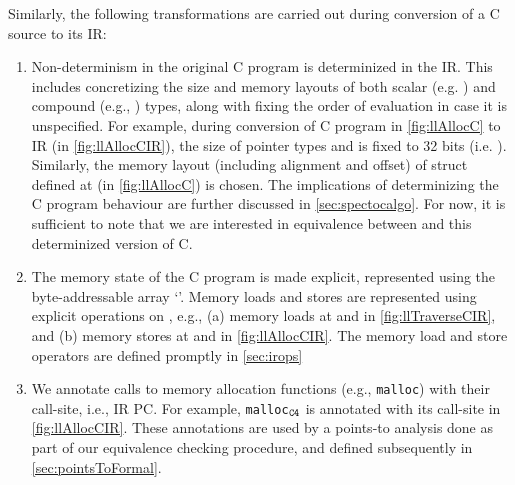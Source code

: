 Similarly, the following transformations are carried out during conversion of a C source to its IR:
\begin{enumerate}
\item Non-determinism in the original C program is determinized in the IR.
This includes concretizing the size and memory layouts of both scalar (e.g. )
and compound (e.g., ) types, along with fixing the order of evaluation in case
it is unspecified.
For example, during conversion of C program in \cref{fig:llAllocC} to IR (in \cref{fig:llAllocCIR}),
the size of pointer types and  is fixed to 32 bits (i.e. ).
Similarly, the memory layout (including alignment and offset) of  struct defined at  (in \cref{fig:llAllocC}) is chosen.
The implications of determinizing the C program behaviour are further discussed in \cref{sec:spectocalgo}.
For now, it is sufficient to note that we are interested in equivalence between \SpecL{} and this determinized version of C.
\item The memory state of the C program is made explicit, represented using the byte-addressable array `\mem{}'.
Memory loads and stores are represented using explicit operations on \mem{}, e.g.,
(a) memory loads at  and  in \cref{fig:llTraverseCIR}, and
(b) memory stores at  and  in \cref{fig:llAllocCIR}.
The memory load and store operators are defined promptly in \cref{sec:irops}
\item We annotate calls to memory allocation functions (e.g., {\tt malloc}) with their call-site, i.e., IR PC.
For example, {\tt malloc$_{{\tt C4}}$} is annotated with its call-site  in \cref{fig:llAllocCIR}.
These annotations are used by a points-to analysis done as part of our equivalence checking procedure,
and defined subsequently in \cref{sec:pointsToFormal}.
\end{enumerate}


